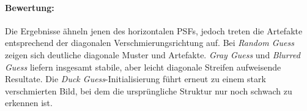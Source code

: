 \paragraph{Bewertung:}
Die Ergebnisse ähneln jenen des horizontalen PSFs, jedoch treten die Artefakte entsprechend der diagonalen Verschmierungsrichtung auf. Bei \textit{Random Guess} zeigen sich deutliche diagonale Muster und Artefakte. \textit{Gray Guess} und \textit{Blurred Guess} liefern insgesamt stabile, aber leicht diagonale Streifen aufweisende Resultate. Die \textit{Duck Guess}-Initialisierung führt erneut zu einem stark verschmierten Bild, bei dem die ursprüngliche Struktur nur noch schwach zu erkennen ist.

\noindent
\begin{minipage}[t]{0.5\textwidth}
\end{minipage}
%
\begin{minipage}[t]{0.5\textwidth}
\end{minipage}

\noindent
\begin{minipage}[t]{0.5\textwidth}
\end{minipage}
%
\begin{minipage}[t]{0.5\textwidth}
\end{minipage}